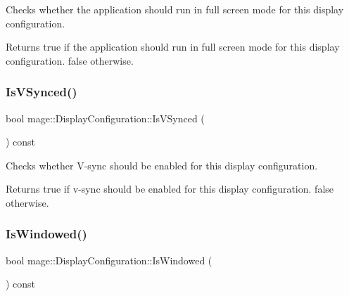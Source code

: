 Checks whether the application should run in full screen mode for this display configuration.

\begin{DoxyReturn}{Returns}
{\ttfamily true} if the application should run in full screen mode for this display configuration. {\ttfamily false} otherwise. 
\end{DoxyReturn}
\hypertarget{structmage_1_1_display_configuration_ab237c9b7953853eb83a51d542dfffb5e}{}\label{structmage_1_1_display_configuration_ab237c9b7953853eb83a51d542dfffb5e} 
\subsubsection{\texorpdfstring{Is\+V\+Synced()}{IsVSynced()}}
{\footnotesize\ttfamily bool mage\+::\+Display\+Configuration\+::\+Is\+V\+Synced (\begin{DoxyParamCaption}{ }\end{DoxyParamCaption}) const\hspace{0.3cm}{\ttfamily [noexcept]}}

Checks whether V-\/sync should be enabled for this display configuration.

\begin{DoxyReturn}{Returns}
{\ttfamily true} if v-\/sync should be enabled for this display configuration. {\ttfamily false} otherwise. 
\end{DoxyReturn}
\hypertarget{structmage_1_1_display_configuration_ae35fedcd9989950c5f15785632dd7a86}{}\label{structmage_1_1_display_configuration_ae35fedcd9989950c5f15785632dd7a86} 
\subsubsection{\texorpdfstring{Is\+Windowed()}{IsWindowed()}}
{\footnotesize\ttfamily bool mage\+::\+Display\+Configuration\+::\+Is\+Windowed (\begin{DoxyParamCaption}{ }\end{DoxyParamCaption}) const\hspace{0.3cm}{\ttfamily [noexcept]}}


